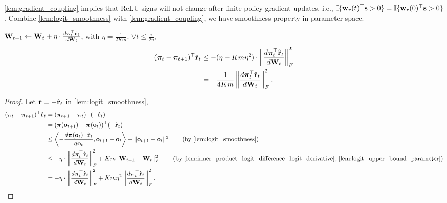 \cref{lem:gradient_coupling} implies that ReLU signs will not change after finite policy gradient updates, i.e., ${\mathbb{I}}\{ {\mathbf{w}}_r(t)^\top {\mathbf{s}} > 0 \} = {\mathbb{I}}\{ {\mathbf{w}}_r(0)^\top {\mathbf{s}} > 0 \}$. Combine \cref{lem:logit_smoothness} with \cref{lem:gradient_coupling}, we have smoothness property in parameter space.
\begin{lem}
\label{lem:empirically_expected_reward_parameter_smoothness}
    ${\mathbf{W}}_{t+1} \gets {\mathbf{W}}_t + \eta \cdot \frac{d {\boldsymbol{\pi}}_t^\top \hat{{\mathbf{r}}}_t}{d {\mathbf{W}}_t}$, with $\eta = \frac{1}{2 K m}$. $\forall t \le \frac{\tau}{ 2 \eta }$,
\begin{equation}
\label{eq:parameter_smoothness}
\begin{split}
    ( {\boldsymbol{\pi}}_t - {\boldsymbol{\pi}}_{t+1} )^\top \hat{{\mathbf{r}}}_t &\le - ( \eta - K m \eta^2 ) \cdot \left\| \frac{d {\boldsymbol{\pi}}_t^\top \hat{{\mathbf{r}}}_t}{d {\mathbf{W}}_t} \right\|_F^2 \\
    &= - \frac{1}{4 K m} \left\| \frac{d {\boldsymbol{\pi}}_t^\top \hat{{\mathbf{r}}}_t}{d {\mathbf{W}}_t} \right\|_F^2.
\end{split}
\end{equation}
\end{lem}
\begin{proof}
   Let ${\mathbf{r}} = - \hat{{\mathbf{r}}}_t$ in \cref{lem:logit_smoothness},
\begin{equation*}
\begin{split}
    ( \rvpi_t - \rvpi_{t+1} )^\top \hat{\rvr}_t &= ( \rvpi_{t+1} - \rvpi_{t} )^\top ( - \hat{\rvr}_t ) \\
    &= ( \rvpi( \rvo_{t+1} )  - \rvpi( \rvo_{t} ) )^\top ( - \hat{\rvr}_t ) \\
    &\le \left\langle - \frac{d \rvpi( \rvo_t )^\top \hat{\rvr}_t}{d \rvo_t}, \rvo_{t+1} - \rvo_t \right\rangle + \| \rvo_{t+1} - \rvo_t  \|^2 \qquad \left( \text{by \cref{lem:logit_smoothness}}\right) \\
    &\le - \eta \cdot \left\| \frac{d \rvpi_t^\top \hat{\rvr}_t}{d \rmW_t} \right\|_F^2 + K m \| \rmW_{t+1} - \rmW_t \|_F^2 \qquad \left( \text{by \cref{lem:inner_product_logit_difference_logit_derivative}, \cref{lem:logit_upper_bound_parameter}} \right) \\
    &= - \eta \cdot \left\| \frac{d \rvpi_t^\top \hat{\rvr}_t}{d \rmW_t} \right\|_F^2 + K m \eta^2 \left\| \frac{d \rvpi_t^\top \hat{\rvr}_t}{d \rmW_t} \right\|_F^2. \qedhere
\end{split}
\end{equation*}
\end{proof}

